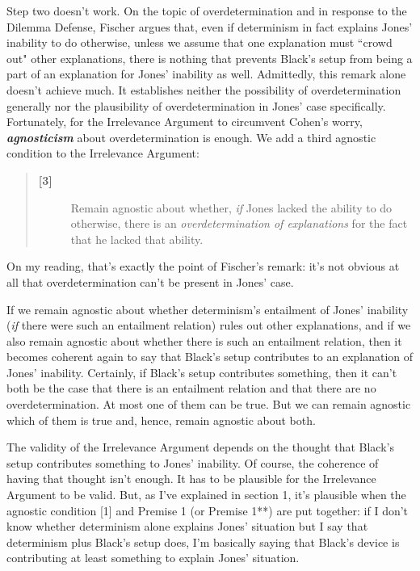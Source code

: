\documentclass[a4paper,12pt]{article}
\begin{document}

Step two doesn't work. On the topic of overdetermination and in response to the Dilemma Defense, Fischer argues that, even if determinism in fact explains Jones' inability to do otherwise, unless we assume that one explanation must ``crowd out" other explanations, there is nothing that prevents Black's setup from being a part of an explanation for Jones' inability as well. Admittedly, this remark alone doesn't achieve much. It establishes neither the possibility of overdetermination generally nor the plausibility of overdetermination in Jones' case specifically. Fortunately, for the Irrelevance Argument to circumvent Cohen's worry, \textbf{\emph{agnosticism}} about overdetermination is enough. We add a third agnostic condition to the Irrelevance Argument:

\begin{quote}
\begin{description}
\item[\textbf{[3]}] Remain agnostic about whether, \emph{if} Jones lacked the ability to do otherwise, there is an \emph{overdetermination of explanations} for the fact that he lacked that ability.
\end{description}
\end{quote}

On my reading, that's exactly the point of Fischer's remark: it's not obvious at all that overdetermination can't be present in Jones' case.

If we remain agnostic about whether determinism's entailment of Jones' inability (\emph{if} there were such an entailment relation) rules out other explanations, and if we also remain agnostic about whether there is such an entailment relation, then it becomes coherent again to say that Black's setup contributes to an explanation of Jones' inability. Certainly, if Black's setup contributes something, then it can't both be the case that there is an entailment relation and that there are no overdetermination. At most one of them can be true. But we can remain agnostic which of them is true and, hence, remain agnostic about both.

The validity of the Irrelevance Argument depends on the thought that Black's setup contributes something to Jones' inability. Of course, the coherence of having that thought isn't enough. It has to be plausible for the Irrelevance Argument to be valid. But, as I've explained in section 1, it's plausible when the agnostic condition [1] and Premise 1 (or Premise 1**) are put together: if I don't know whether determinism alone explains Jones' situation but I say that determinism plus Black's setup does, I'm basically saying that Black's device is contributing at least something to explain Jones' situation.
\end{document}
